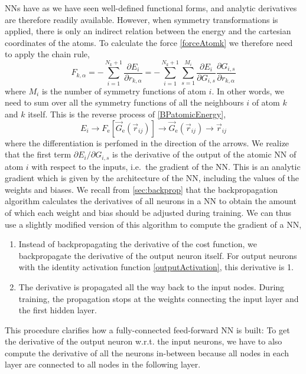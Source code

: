 \documentclass[twoside,english]{uiofysmaster}
\begin{document}
NNs have as we have seen well-defined functional forms, and analytic derivatives are therefore readily available.
However, when symmetry transformations is applied, there is only an indirect relation between the energy and the cartesian coordinates
of the atoms. To calculate the force \eqref{forceAtomk} we therefore need to apply the chain rule,
\begin{equation}
 F_{k,\alpha} = -\sum_{i=1}^{N_k+1}\frac{\partial E_i}{\partial r_{k,\alpha}} = 
 -\sum_{i=1}^{N_k+1}\sum_{s=1}^{M_i}\frac{\partial E_i}{\partial G_{i,s}}\frac{\partial G_{i,s}}{\partial r_{k,\alpha}}
 \label{forceAtomkChainRule}
\end{equation}
where $M_i$ is the number of symmetry functions of atom $i$. In other words, we need to sum over all the symmetry functions
of all the neighbours $i$ of atom $k$ and $k$ itself. This is the reverse process of \eqref{BPatomicEnergy},
\begin{equation}
 E_i \rightarrow F_\mathrm{e}[\vec{G}_\mathrm{e}(\vec{r}_{ij})] \rightarrow
 \vec{G}_\mathrm{e}(\vec{r}_{ij}) \rightarrow  \vec{r}_{ij}   
 \label{BPatomicForce}
\end{equation}
where the differentiation is perfomed in the direction of the arrows. 
We realize that the first term
$\partial E_i/\partial G_{i,s}$ is the derivative of the output of the atomic NN of atom $i$ with respect to the inputs,
i.e.\ the gradient of the NN. This is an analytic gradient
which is given by the architecture of the NN, including the values of the weights and biases.
We recall from \autoref{sec:backprop} that the backpropagation algorithm calculates the derivatives of all neurons in a NN to obtain
the amount of which each weight and bias should be adjusted during training. We can thus use a slightly modified version
of this algorithm to compute the gradient of a NN,
\begin{enumerate}
 \item Instead of backpropagating the derivative of the cost function, 
 we backpropagate the derivative of the output neuron itself.
 For output neurons with the identity activation function \eqref{outputActivation}, 
 this derivative is 1. 
 \item The derivative is propagated all the way back to the input nodes. During training, the propagation
 stops at the weights connecting the input layer and the first hidden layer. 
\end{enumerate}
This procedure clarifies how a fully-connected feed-forward NN is built: To get the derivative of the output neuron
w.r.t. the input neurons, we have to also compute the derivative of all the neurons in-between because
all nodes in each layer are connected to all nodes in the following layer. 
\end{document}
